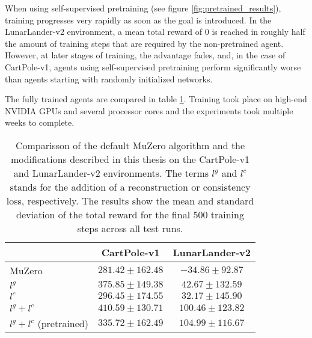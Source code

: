 When using self-supervised pretraining (see figure \ref{fig:pretrained_results}), training progresses very rapidly as soon as the goal is introduced. In the LunarLander-v2 environment, a mean total reward of $0$ is reached in roughly half the amount of training steps that are required by the non-pretrained agent. However, at later stages of training, the advantage fades, and, in the case of CartPole-v1, agents using self-supervised pretraining perform significantly worse than agents starting with randomly initialized networks.

The fully trained agents are compared in table \ref{tab:results_table}. Training took place on high-end NVIDIA GPUs and several processor cores and the experiments took multiple weeks to complete.
\begin{table}[ht]
    \centering
    \begin{tabular}{|l||c|c|}
        \hline
        & CartPole-v1 & LunarLander-v2 \\
        \hline \hline
        MuZero & $281.42 \pm 162.48$ & $-34.86 \pm 92.87$ \\
        \hline
        $l^g$ & $375.85 \pm 149.38$ & $42.67 \pm 132.59$\\
        \hline
        $l^c$ & $296.45 \pm 174.55$ & $32.17 \pm 145.90$ \\
        \hline
        $l^g + l^c$ & $\mathbf{410.59 \pm 130.71}$ & $100.46 \pm 123.82$ \\
        \hline
        $l^g + l^c$ (pretrained) & $335.72 \pm 162.49$ & $\mathbf{104.99 \pm 116.67}$ \\
        \hline
    \end{tabular}
    \caption{Comparisson of the default MuZero algorithm and the modifications described in this thesis on the CartPole-v1 and LunarLander-v2 environments. The terms $l^g$ and $l^c$ stands for the addition of a reconstruction or consistency loss, respectively. The results show the mean and standard deviation of the total reward for the final $500$ training steps across all test runs.}
    \label{tab:results_table}
\end{table}
